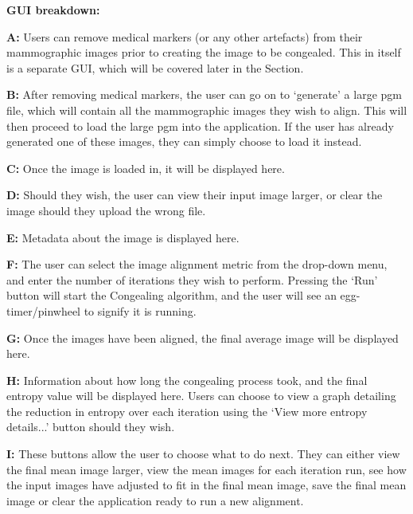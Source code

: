 \vspace{4cm}

\noindent \textbf{\acrshort{GUI} breakdown: }

\noindent \textbf{ A: } Users can remove medical markers (or any other artefacts) from their mammographic images prior to creating the image to be congealed. This in itself is a separate \acrshort{GUI}, which will be covered later in the Section.

\noindent \textbf{ B: } After removing medical markers, the user can go on to `generate' a large pgm file, which will contain all the mammographic images they wish to align. This will then proceed to load the large pgm into the application. If the user has already generated one of these images, they can simply choose to load it instead.

\noindent \textbf{ C: } Once the image is loaded in, it will be displayed here.

\noindent \textbf{ D: } Should they wish, the user can view their input image larger, or clear the image should they upload the wrong file.

\noindent \textbf{ E: } Metadata about the image is displayed here.

\noindent \textbf{ F: } The user can select the image alignment metric from the drop-down menu, and enter the number of iterations they wish to perform. Pressing the `Run' button will start the \Gls{Congealing} algorithm, and the user will see an egg-timer/pinwheel to signify it is running.

\noindent \textbf{ G: } Once the images have been aligned, the final average image will be displayed here.

\noindent \textbf{ H: } Information about how long the congealing process took, and the final entropy value will be displayed here. Users can choose to view a graph detailing the reduction in entropy over each iteration using the `View more entropy details...' button should they wish.

\noindent \textbf{ I: } These buttons allow the user to choose what to do next. They can either view the final mean image larger, view the mean images for each iteration run, see how the input images have adjusted to fit in the final mean image, save the final mean image or clear the application ready to run a new alignment.

